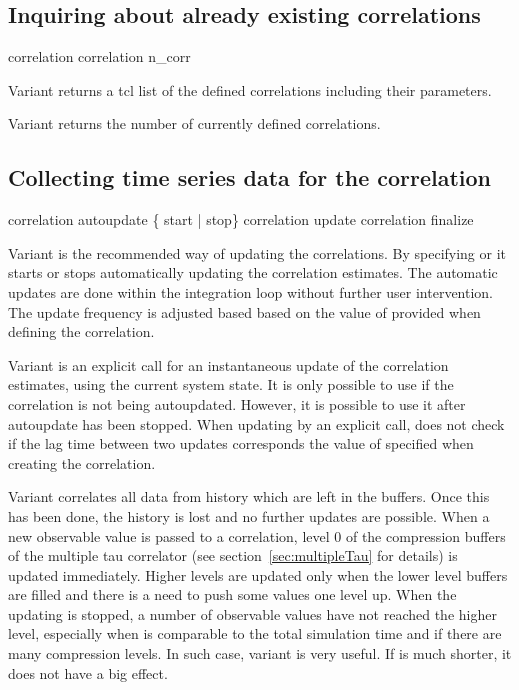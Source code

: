 \subsection{Inquiring about already existing correlations}
\begin{essyntax}
 correlation 
 correlation n_corr
\end{essyntax}

Variant  returns a tcl list of the defined correlations
including their parameters.    

Variant  returns the number of currently
defined correlations.  
  
\subsection{Collecting time series data for the correlation}

\begin{essyntax}
 correlation  autoupdate \{ start | stop\} 
 correlation  update 
 correlation  finalize
\end{essyntax}

Variant  is the recommended way of updating the correlations.
By specifying  or  it starts or stops automatically
updating the correlation estimates. The automatic updates are done
within the integration loop without further user intervention.
The update frequency is adjusted based based on the value of  
provided when defining the correlation.  

Variant  is an explicit call for an instantaneous 
update of the correlation estimates, using the current system
state. It is only possible to use  if the correlation
is not being autoupdated. However, it is possible to use it
after autoupdate has been stopped. When updating by an explicit
call, \es does not check if the lag time between two updates
corresponds the value of  specified when creating the 
correlation.

Variant  correlates all data from history which are left in
the buffers. Once this has been done, the history is lost and no
further updates are possible. 
When a new observable value is passed to a correlation,
level 0 of the compression buffers of the multiple tau
correlator (see section~\ref{sec:multipleTau} for details) 
is updated immediately. Higher levels are
updated only when the lower level buffers are filled and
there is a need to push some values one level up. When the
updating is stopped, a number of observable values have not
reached the higher level, especially when  
is comparable to the total simulation time
and if there are many compression levels. In such case,
variant  is very useful. If  
is much shorter, it does not have a big effect.


